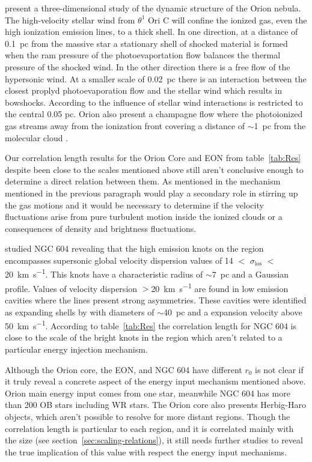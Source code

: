 \documentclass[fleqn,usenatbib, useAMS, a4paper]{mnras}
\begin{document}
\citet{2009AJ....137..367O} present a three-dimensional study of the dynamic structure of the Orion nebula.
The high-velocity stellar wind from \(\theta^1\) Ori C will confine the ionized gas, even the high ionization emission lines, to a thick shell.
In one direction, at a distance of \SI{0.1}{pc} from the massive star a stationary shell of shocked material is formed when the ram pressure of the photoevaportation flow balances the thermal pressure of the shocked wind.
In the other direction there is a free flow of the hypersonic wind.
At a smaller scale of \SI{0.02}{pc} there is an interaction between the closest proplyd photoevaporation flow and the stellar wind which results in bowshocks.
According to \citet{2001ApJ...561..830G} the influence of stellar wind interactions is restricted to the central 0.05 pc. 
Orion also present a champagne flow where the photoionized gas streams away from the ionization front covering a distance of \(\sim\)\SI{1}{pc} from the molecular cloud \citep{1973ApJ...183..863Z}.

Our correlation length results for the Orion Core and EON from table~\ref{tab:Res} despite been close to the scales mentioned above still aren't conclusive enough to determine a direct relation between them.
As mentioned in \citet{arthur2016turbulence} the mechanism mentioned in the previous paragraph would play a secondary role in stirring up the gas motions and it would be necessary to determine if the velocity fluctuations arise from pure turbulent motion inside the ionized clouds or a consequences of density and brightness fluctuations.

\citet{sabalisck1995supersonic} studied NGC 604 revealing that the high emission knots on the region encompasses supersonic global velocity dispersion values of 14 $<$ \(\sigma_{\text{los}}\) $<$ \SI{20}{km.s^{-1}}.
This knots have a characteristic radius of \(\sim\)\SI{7}{pc} and a Gaussian profile.
Values of velocity dispersion $>$\SI{20}{km.s^{-1}} are found in low emission cavities where the lines present strong asymmetries.
These cavities were identified as expanding shells by \cite{yang1996} with diameters of \(\sim\)\SI{40}{pc} and a expansion velocity above \SI{50}{km.s^{-1}}.
According to table~\ref{tab:Res} the correlation length for NGC 604 is close to the scale of the bright knots in the region which aren't related to a particular energy injection mechanism.

Although the Orion core, the EON, and NGC 604 have different \(r_0\) is not clear if it truly reveal a concrete aspect of the energy input mechanism mentioned above.
Orion main energy input comes from one star, meanwhile NGC 604 has more than 200 OB stars including WR stars. 
The Orion core also presents Herbig-Haro objects, which aren't possible to resolve for more distant regions.
Though the correlation length is particular to each region, and it is correlated mainly with the size (see section~\ref{sec:scaling-relations}), it still needs further studies to reveal the true implication of this value with respect the energy input mechanisms.
\end{document}
